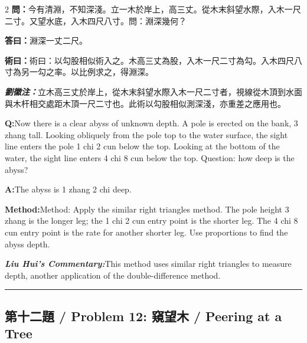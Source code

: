 \documentclass[11pt,a4paper]{article}
\newcommand{\cnwen}{\textcolor{cnlabelfg}{\textbf{問：}}}
\newcommand{\cnda}{\textbf{答曰：}}
\newcommand{\cnshu}{\textcolor{cnlabelfg}{\textbf{術曰：}}}
\newcommand{\cnzhu}{\textcolor{commentarycolor}{\textit{\textbf{劉徽注：}}}}
\newcommand{\enwen}{\textcolor{enlabelfg}{\textbf{Q:}}}
\newcommand{\enda}{\textcolor{enlabelfg}{\textbf{A:}}}
\newcommand{\enshu}{\textcolor{enlabelfg}{\textbf{Method:}}}
\newcommand{\enzhu}{\textcolor{enlabelfg}{\textit{\textbf{Liu Hui's Commentary:}}}}
\begin{document}
\begin{paracol}{2}
\switchcolumn[0]
\cnwen 今有清淵，不知深淺。立一木於岸上，高三丈。從木末斜望水際，入木一尺二寸。又望水底，入木四尺八寸。問：淵深幾何？

\cnda 淵深一丈二尺。

\cnshu 術曰：以勾股相似術入之。木高三丈為股，入木一尺二寸為勾。入木四尺八寸為另一勾之率。以比例求之，得淵深。

\cnzhu 立木高三丈於岸上，從木末斜望水際入木一尺二寸者，視線從木頂到水面與木杆相交處距木頂一尺二寸也。此術以勾股相似測深淺，亦重差之應用也。

\switchcolumn[1]
\enwen Now there is a clear abyss of unknown depth. A pole is erected on the bank, 3 zhang tall. Looking obliquely from the pole top to the water surface, the sight line enters the pole 1 chi 2 cun below the top. Looking at the bottom of the water, the sight line enters 4 chi 8 cun below the top. Question: how deep is the abyss?

\enda The abyss is 1 zhang 2 chi deep.

\enshu Method: Apply the similar right triangles method. The pole height 3 zhang is the longer leg; the 1 chi 2 cun entry point is the shorter leg. The 4 chi 8 cun entry point is the rate for another shorter leg. Use proportions to find the abyss depth.

\enzhu This method uses similar right triangles to measure depth, another application of the double-difference method.
\end{paracol}

\bigskip\hrule\bigskip

\subsection{第十二題 / Problem 12: 窺望木 / Peering at a Tree}
\end{document}
